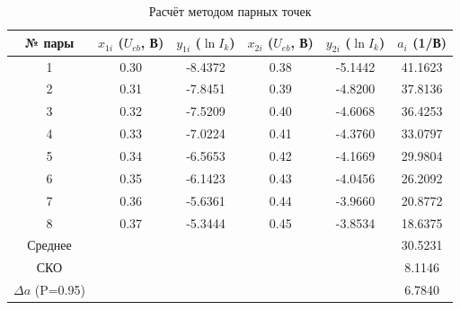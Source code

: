 \begin{table}[h]
\centering
\caption{Расчёт методом парных точек}
\label{tab:pairs}
\begin{tabular}{|c|c|c|c|c|c|}
\hline
№ пары & $x_{1i}$ ($U_{eb}$, В) & $y_{1i}$ ($\ln I_k$) & $x_{2i}$ ($U_{eb}$, В) & $y_{2i}$ ($\ln I_k$) & $a_i$ (1/В) \\
\hline
1 & 0.30 & -8.4372 & 0.38 & -5.1442 & 41.1623 \\
2 & 0.31 & -7.8451 & 0.39 & -4.8200 & 37.8136 \\
3 & 0.32 & -7.5209 & 0.40 & -4.6068 & 36.4253 \\
4 & 0.33 & -7.0224 & 0.41 & -4.3760 & 33.0797 \\
5 & 0.34 & -6.5653 & 0.42 & -4.1669 & 29.9804 \\
6 & 0.35 & -6.1423 & 0.43 & -4.0456 & 26.2092 \\
7 & 0.36 & -5.6361 & 0.44 & -3.9660 & 20.8772 \\
8 & 0.37 & -5.3444 & 0.45 & -3.8534 & 18.6375 \\
\hline
Среднее & & & & & 30.5231 \\
СКО & & & & & 8.1146 \\
$\Delta a$ (P=0.95) & & & & & 6.7840 \\
\hline
\end{tabular}
\end{table}
